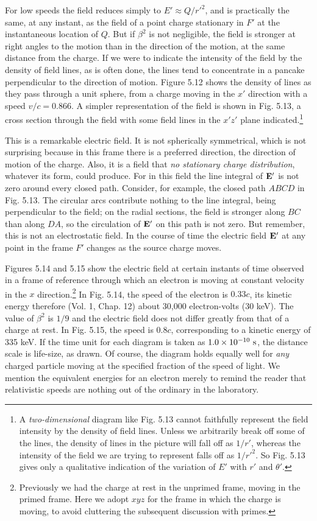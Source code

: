 For low speeds the field reduces simply to $E' \approx Q/r'^2$, and is practically
the same, at any instant, as the field of a point charge stationary
in $F'$ at the instantaneous location of $Q$. But if $\beta^2$ is not
negligible, the field is stronger at right angles to the motion than in
the direction of the motion, at the same distance from the charge.
If we were to indicate the intensity of the field by the density of field
lines, as is often done, the lines tend to concentrate in a pancake
perpendicular to the direction of motion. Figure 5.12 shows the
density of lines as they pass through a unit sphere, from a charge
moving in the $x'$ direction with a speed $v/c = 0.866$. A simpler representation
of the field is shown in Fig. 5.13, a cross section through
the field with some field lines in the $x'z'$ plane 
indicated.\footnote{A \emph{two-dimensional}
diagram like Fig. 5.13 cannot faithfully represent the field intensity
by the density of field lines. Unless we arbitrarily break off some of the lines,
the density of lines in the picture will fall off as $1/r'$, whereas the intensity of the field
we are trying to represent falls off as $1/r'^2$. So Fig. 5.13 gives only a qualitative 
indication of the variation of $E'$ with $r'$ and $\theta'$.}

This is a remarkable electric field. It is not spherically symmetrical,
which is not surprising because in this frame there is a preferred
direction, the direction of motion of the charge. Also, it is a field
that \emph{no stationary charge distribution}, whatever its form, could produce.
For in this field the line integral of $\mathbf{E}'$ is not zero around every
closed path. Consider, for example, the closed path $ABCD$ in
Fig. 5.13. The circular arcs contribute nothing to the line integral,
being perpendicular to the field; on the radial sections, the field is
stronger along $BC$ than along $DA$, so the circulation of $\mathbf{E}'$ on this path
is not zero. But remember, this is not an electrostatic field. In the
course of time the electric field $\mathbf{E}'$ at any point in the frame $F'$ changes
as the source charge moves.

Figures 5.14 and 5.15 show the electric field at certain instants of
time observed in a frame of reference through which an electron is
moving at constant velocity in the $x$
direction.\footnote{Previously we had the charge at rest in the unprimed frame, moving in the primed
frame. Here we adopt $xyz$ for the frame in which the charge is moving, to avoid cluttering
the subsequent discussion with primes.} In Fig. 5.14, the
speed of the electron is $0.33c$, its kinetic energy therefore (Vol. 1,
Chap. 12) about 30,000 electron-volts (30 keV). The value of $\beta^2$
is $1/9$ and the electric field does not differ greatly from that of a charge
at rest. In Fig. 5.15, the speed is $0.8c$, corresponding to a kinetic
energy of 335 keV. If the time unit for each diagram is taken as
$1.0 \times 10^{-10}\ \sunit$, the distance scale is life-size, as drawn. Of course,
the diagram holds equally well for \emph{any} charged particle moving at
the specified fraction of the speed of light. We mention the equivalent
energies for an electron merely to remind the reader that relativistic
speeds are nothing out of the ordinary in the laboratory.

